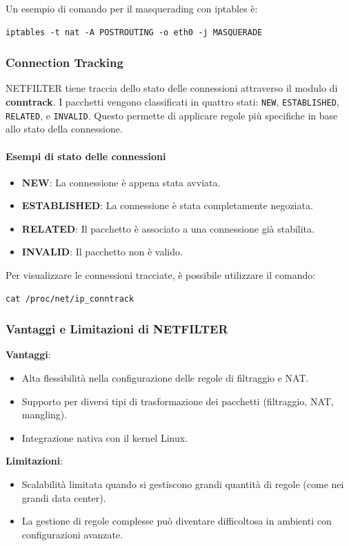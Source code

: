 Un esempio di comando per il masquerading con iptables è:
\begin{verbatim}
iptables -t nat -A POSTROUTING -o eth0 -j MASQUERADE
\end{verbatim}

\subsubsection{Connection Tracking}
NETFILTER tiene traccia dello stato delle connessioni attraverso il modulo di \textbf{conntrack}. I pacchetti vengono classificati in quattro stati: \texttt{NEW}, \texttt{ESTABLISHED}, \texttt{RELATED}, e \texttt{INVALID}. Questo permette di applicare regole più specifiche in base allo stato della connessione.

\paragraph{Esempi di stato delle connessioni}
\begin{itemize}
  \item \textbf{NEW}: La connessione è appena stata avviata.
  \item \textbf{ESTABLISHED}: La connessione è stata completamente negoziata.
  \item \textbf{RELATED}: Il pacchetto è associato a una connessione già stabilita.
  \item \textbf{INVALID}: Il pacchetto non è valido.
\end{itemize}

Per visualizzare le connessioni tracciate, è possibile utilizzare il comando:
\begin{verbatim}
cat /proc/net/ip_conntrack
\end{verbatim}

\subsubsection{Vantaggi e Limitazioni di NETFILTER}
\textbf{Vantaggi}:
\begin{itemize}
  \item Alta flessibilità nella configurazione delle regole di filtraggio e NAT.
  \item Supporto per diversi tipi di trasformazione dei pacchetti (filtraggio, NAT, mangling).
  \item Integrazione nativa con il kernel Linux.
\end{itemize}

\textbf{Limitazioni}:
\begin{itemize}
  \item Scalabilità limitata quando si gestiscono grandi quantità di regole (come nei grandi data center).
  \item La gestione di regole complesse può diventare difficoltosa in ambienti con configurazioni avanzate.
\end{itemize}

